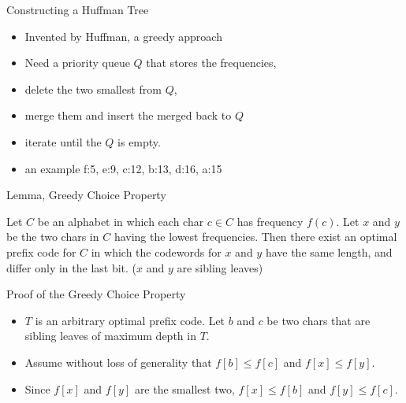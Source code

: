 \documentclass{beamer}
\begin{document}
\begin{frame}{}
\begin{center}
{\large Constructing a Huffman Tree}
\end{center}
\begin{itemize}
\item Invented by Huffman, a greedy approach
\item Need a priority queue $Q$ that stores the frequencies,
\item delete the two smallest from $Q$,
\item merge them and insert the merged back to $Q$
\item iterate until the $Q$ is empty. 
\item {\small an example f:5, e:9, c:12, b:13, d:16, a:15}
\end{itemize}
\end{frame}

\begin{frame}{}
\begin{center}
{\large Lemma, Greedy Choice Property}
\end{center}
Let $C$ be an alphabet in which each char $c\in C$ has frequency $f(c)$.
Let $x$ and $y$ be the two chars in $C$ having the lowest frequencies.  
Then there exist an optimal prefix code for $C$ in which the codewords for 
 $x$ and $y$ have the same length, and differ only in the last bit. 
 ($x$ and $y$ are sibling leaves)
\end{frame}

\begin{frame}{}
\begin{center}
{\large Proof of the Greedy Choice Property}
\end{center}
\begin{itemize}
\item $T$ is an arbitrary optimal prefix code.  Let $b$ and $c$ be two chars that
 are sibling leaves of maximum depth in $T$.  
\item Assume without loss of generality that $f[b]\le f[c]$ and $f[x]\le f[y]$.  
\item Since $f[x]$ and $f[y]$ are the smallest two, $f[x]\le f[b]$ and 
 $f[y]\le f[c]$.  
\end{itemize}
\end{frame}
\end{document}
